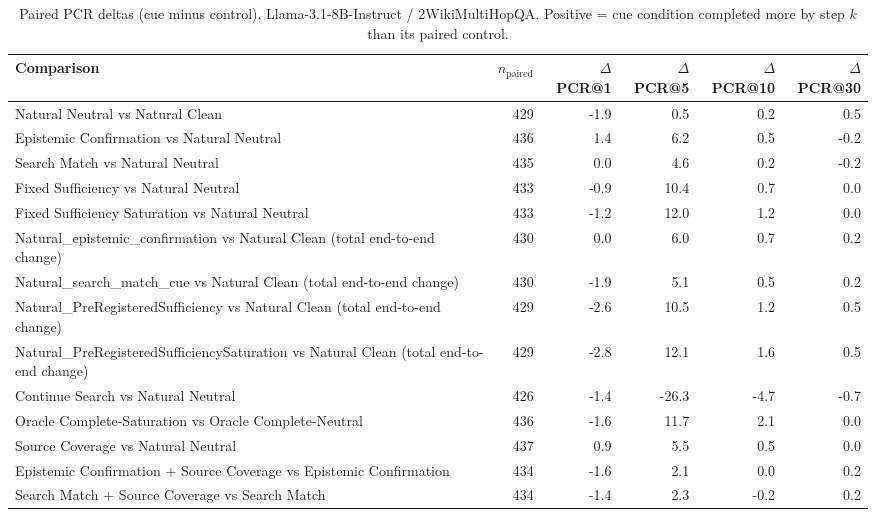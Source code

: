 \begin{table}[t]
\centering
\caption{Paired PCR deltas (cue minus control), Llama-3.1-8B-Instruct / 2WikiMultiHopQA. Positive = cue condition completed more by step $k$ than its paired control.}
\begin{tabular}{lrrrrr}
\toprule
Comparison & $n_{\text{paired}}$ & $\Delta$PCR@1 & $\Delta$PCR@5 & $\Delta$PCR@10 & $\Delta$PCR@30 \\
\midrule
Natural Neutral vs Natural Clean & 429 & -1.9 & 0.5 & 0.2 & 0.5 \\
Epistemic Confirmation vs Natural Neutral & 436 & 1.4 & 6.2 & 0.5 & -0.2 \\
Search Match vs Natural Neutral & 435 & 0.0 & 4.6 & 0.2 & -0.2 \\
Fixed Sufficiency vs Natural Neutral & 433 & -0.9 & 10.4 & 0.7 & 0.0 \\
Fixed Sufficiency Saturation vs Natural Neutral & 433 & -1.2 & 12.0 & 1.2 & 0.0 \\
Natural\_epistemic\_confirmation vs Natural Clean (total end-to-end change) & 430 & 0.0 & 6.0 & 0.7 & 0.2 \\
Natural\_search\_match\_cue vs Natural Clean (total end-to-end change) & 430 & -1.9 & 5.1 & 0.5 & 0.2 \\
Natural\_PreRegisteredSufficiency vs Natural Clean (total end-to-end change) & 429 & -2.6 & 10.5 & 1.2 & 0.5 \\
Natural\_PreRegisteredSufficiencySaturation vs Natural Clean (total end-to-end change) & 429 & -2.8 & 12.1 & 1.6 & 0.5 \\
Continue Search vs Natural Neutral & 426 & -1.4 & -26.3 & -4.7 & -0.7 \\
Oracle Complete-Saturation vs Oracle Complete-Neutral & 436 & -1.6 & 11.7 & 2.1 & 0.0 \\
Source Coverage vs Natural Neutral & 437 & 0.9 & 5.5 & 0.5 & 0.0 \\
Epistemic Confirmation + Source Coverage vs Epistemic Confirmation & 434 & -1.6 & 2.1 & 0.0 & 0.2 \\
Search Match + Source Coverage vs Search Match & 434 & -1.4 & 2.3 & -0.2 & 0.2 \\
\bottomrule
\end{tabular}
\end{table}

